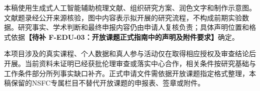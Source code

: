 \justifying
\NSFCBodyText

本稿使用生成式人工智能辅助梳理文献、组织研究方案、润色文字和制作示意图。文献题录经公开来源核验，图中内容表示拟开展的研究流程，不构成前期实验数据。研究事实、学术判断和最终申报内容仍由申请人复核负责；具体声明位置和格式依据\textbf{【待补 F-EDU-03：开放课题正式指南中的声明及附件要求】}确定。

本项目涉及的真实课程、个人数据和真人参与活动仅在取得相应授权及审查结论后开展。当前资料未证明已经获批伦理审查或落实中心合作，相关条件按研究基础与工作条件部分所列事实缺口补齐。正式申请文件需依据开放课题指定格式整理，本稿保留的NSFC专属栏目不替代开放课题的申报表、签章或附件。
